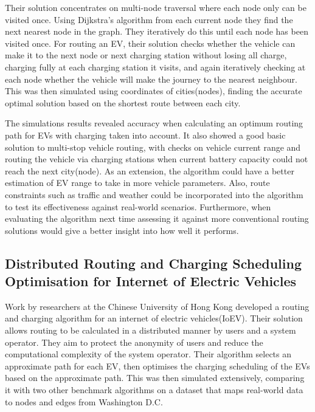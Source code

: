 \documentclass[11pt]{report}
\begin{document}
Their solution concentrates on multi-node traversal where each node only can be visited once. Using Dijkstra's algorithm from each current node they find the next nearest node in the graph. They iteratively do this until each node has been visited once. For routing an EV, their solution checks whether the vehicle can make it to the next node or next charging station without losing all charge, charging fully at each charging station it visits, and again iteratively checking at each node whether the vehicle will make the journey to the nearest neighbour. This was then simulated using coordinates of cities(nodes), finding the accurate optimal solution based on the shortest route between each city.

The simulations results revealed accuracy when calculating an optimum routing path for EVs with charging taken into account. It also showed a good basic solution to multi-stop vehicle routing, with checks on vehicle current range and routing the vehicle via charging stations when current battery capacity could not reach the next city(node). As an extension, the algorithm could have a better estimation of EV range to take in more vehicle parameters. Also, route constraints such as traffic and weather could be incorporated into the algorithm to test its effectiveness against real-world scenarios. Furthermore, when evaluating the algorithm next time assessing it against more conventional routing solutions would give a better insight into how well it performs.

\subsection{Distributed Routing and Charging Scheduling Optimisation for Internet of Electric Vehicles  \autocite{distributedRoutingTang}}

Work by researchers at the Chinese University of Hong Kong developed a routing and charging algorithm for an internet of electric vehicles(IoEV). Their solution allows routing to be calculated in a distributed manner by users and a system operator. They aim to protect the anonymity of users and reduce the computational complexity of the system operator. Their algorithm selects an approximate path for each EV, then optimises the charging scheduling of the EVs based on the approximate path. This was then simulated extensively, comparing it with two other benchmark algorithms on a dataset that maps real-world data to nodes and edges from Washington D.C.
\end{document}

